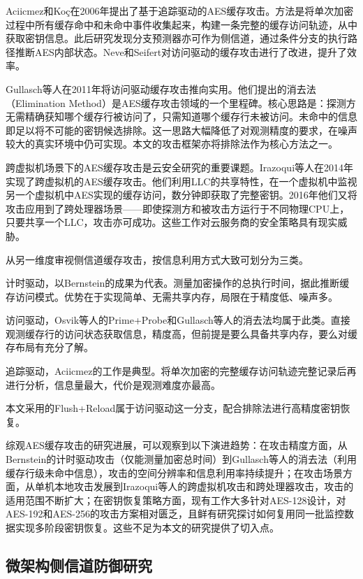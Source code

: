 Aciicmez和Koç在2006年提出了基于追踪驱动的AES缓存攻击\cite{Aciicmez2006b}。方法是将单次加密过程中所有缓存命中和未命中事件收集起来，构建一条完整的缓存访问轨迹，从中获取密钥信息。此后研究发现分支预测器亦可作为侧信道\cite{Aciicmez2007}，通过条件分支的执行路径推断AES内部状态。Neve和Seifert对访问驱动的缓存攻击进行了改进\cite{Neve2007}，提升了效率。

Gullasch等人在2011年将访问驱动缓存攻击推向实用\cite{Gullasch2011}。他们提出的消去法（Elimination Method）是AES缓存攻击领域的一个里程碑。核心思路是：探测方无需精确获知哪个缓存行被访问了，只需知道哪个缓存行未被访问。未命中的信息即足以将不可能的密钥候选排除。这一思路大幅降低了对观测精度的要求，在噪声较大的真实环境中仍可实现。本文的攻击框架亦将排除法作为核心方法之一。

跨虚拟机场景下的AES缓存攻击是云安全研究的重要课题。Irazoqui等人在2014年实现了跨虚拟机的AES缓存攻击\cite{Irazoqui2014}。他们利用LLC的共享特性，在一个虚拟机中监视另一个虚拟机中AES实现的缓存访问，数分钟即获取了完整密钥。2016年他们又将攻击应用到了跨处理器场景\cite{Irazoqui2016}——即使探测方和被攻击方运行于不同物理CPU上，只要共享一个LLC，攻击亦可成功。这些工作对云服务商的安全策略具有现实威胁。

从另一维度审视侧信道缓存攻击，按信息利用方式大致可划分为三类。

计时驱动，以Bernstein的成果为代表。测量加密操作的总执行时间，据此推断缓存访问模式。优势在于实现简单、无需共享内存，局限在于精度低、噪声多。

访问驱动，Osvik等人的Prime+Probe和Gullasch等人的消去法均属于此类。直接观测缓存行的访问状态获取信息，精度高，但前提是要么具备共享内存，要么对缓存布局有充分了解。

追踪驱动，Aciicmez的工作是典型。将单次加密的完整缓存访问轨迹完整记录后再进行分析，信息量最大，代价是观测难度亦最高。

本文采用的Flush+Reload属于访问驱动这一分支，配合排除法进行高精度密钥恢复。

综观AES缓存攻击的研究进展，可以观察到以下演进趋势：在攻击精度方面，从Bernstein的计时驱动攻击（仅能测量加密总时间）到Gullasch等人的消去法（利用缓存行级未命中信息），攻击的空间分辨率和信息利用率持续提升；在攻击场景方面，从单机本地攻击发展到Irazoqui等人的跨虚拟机攻击和跨处理器攻击，攻击的适用范围不断扩大；在密钥恢复策略方面，现有工作大多针对AES-128设计，对AES-192和AES-256的攻击方案相对匮乏，且鲜有研究探讨如何复用同一批监控数据实现多阶段密钥恢复。这些不足为本文的研究提供了切入点。

\subsection{微架构侧信道防御研究}

